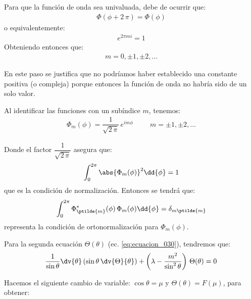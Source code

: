 Para que la función de onda sea univaluada, debe de ocurrir que:
\begin{align}
\Phi(\phi +  2 \, \pi) = \Phi(\phi)
\label{eq:ecuacion_031}
\end{align}
o equivalentemente:
\begin{align*}
e^{2 \pi m i} = 1
\end{align*}
Obteniendo entonces que:
\begin{align*}
m = 0, \pm 1, \pm 2, \ldots
\end{align*}

En este paso se justifica que no podríamos haber establecido una constante positiva (o compleja) porque entonces la función de onda no habría sido de un solo valor.
\par
Al identificar las funciones con un subíndice $m$, tenemos:
\begin{align}
\Phi_{m}(\phi) = \dfrac{1}{\sqrt{2 \, \pi}} \, e^{i m \phi} \hspace{1cm} m = \pm 1, \pm 2, \ldots
\label{eq:ecuacion_032}
\end{align}

Donde el factor $\dfrac{1}{\sqrt{2 \, \pi}}$ asegura que:
\begin{align*}
\int_{0}^{2 \pi} \abs{\Phi_{m}(\phi)}^{2} \dd{\phi} = 1
\end{align*}
que es la condición de normalización. Entonces se tendrá que:
\begin{align}
\int_{0}^{2 \pi} \Phi_{\ptilde{m}}^{*}(\phi) \, \Phi_{m}(\phi) \dd{\phi} = \delta_{m \ptilde{m}}
\label{eq:ecuacion_033}
\end{align}
representa la condición de ortonormalización para $\Phi_{m}(\phi)$.
\par
Para la segunda ecuación $\Theta (\theta)$ (ec. \ref{eq:ecuacion_030}), tendremos que:
\begin{align}
\dfrac{1}{\sin \theta} \dv{\theta} \left( \sin \theta \, \dv{\Theta}{\theta} \right) + \left( \lambda - \dfrac{m^{2}}{\sin^{2} \theta} \right) \, \Theta (\theta) = 0
\label{eq:ecuacion_034}
\end{align}

Hacemos el siguiente cambio de variable: $\cos \theta = \mu$ y $\Theta(\theta) = F(\mu)$, para obtener:

